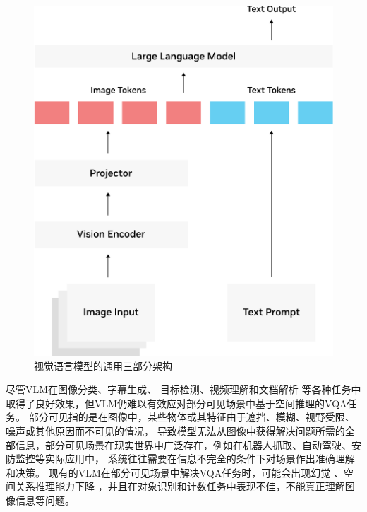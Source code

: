 \begin{figure}[htb]
    \centering
    \includegraphics[scale=0.6]{figures/vlm-architecture-diagram-crop.pdf}
    \caption{视觉语言模型的通用三部分架构}
    \label{fig:vlm-architecture}
\end{figure}

尽管VLM在图像分类\cite{pratt2023does}、字幕生成\cite{alaluf2024myvlm}、
目标检测\cite{kuo2022f}、视频理解\cite{huang2024lita}和文档解析\cite{lv2023kosmos}
等各种任务中取得了良好效果，但VLM仍难以有效应对部分可见场景中基于空间推理的VQA任务。
部分可见指的是在图像中，某些物体或其特征由于遮挡、模糊、视野受限、噪声或其他原因而不可见的情况，
导致模型无法从图像中获得解决问题所需的全部信息，部分可见场景在现实世界中广泛存在，例如在机器人抓取、自动驾驶、安防监控等实际应用中，
系统往往需要在信息不完全的条件下对场景作出准确理解和决策。
现有的VLM在部分可见场景中解决VQA任务时，可能会出现幻觉\cite{vardi2025clipupclipbasedunanswerableproblem}
、空间关系推理能力下降\cite{chen2024spatialvlmendowingvisionlanguagemodels}\cite{anis2025limitationsvisionlanguagemodelsunderstanding}
，并且在对象识别和计数任务中表现不佳\cite{campbell2024understandinglimitsvisionlanguage}，不能真正理解图像信息\cite{rahmanzadehgervi2025visionlanguagemodelsblind}等问题。

